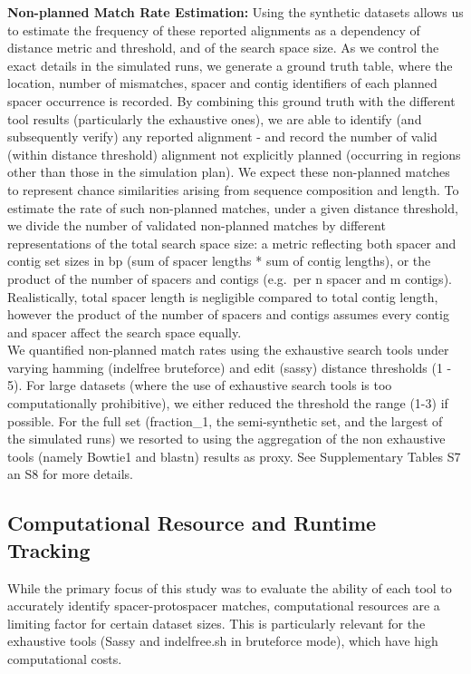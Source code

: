 \documentclass[
]{article}
\begin{document}
\textbf{Non-planned Match Rate Estimation:} Using the synthetic datasets
allows us to estimate the frequency of these reported alignments as a
dependency of distance metric and threshold, and of the search space
size. As we control the exact details in the simulated runs, we generate
a ground truth table, where the location, number of mismatches, spacer
and contig identifiers of each planned spacer occurrence is recorded. By
combining this ground truth with the different tool results
(particularly the exhaustive ones), we are able to identify (and
subsequently verify) any reported alignment - and record the number of
valid (within distance threshold) alignment not explicitly planned
(occurring in regions other than those in the simulation plan). We
expect these non-planned matches to represent chance similarities
arising from sequence composition and length. To estimate the rate of
such non-planned matches, under a given distance threshold, we divide
the number of validated non-planned matches by different representations
of the total search space size: a metric reflecting both spacer and
contig set sizes in bp (sum of spacer lengths * sum of contig lengths),
or the product of the number of spacers and contigs (e.g.~per n spacer
and m contigs). Realistically, total spacer length is negligible
compared to total contig length, however the product of the number of
spacers and contigs assumes every contig and spacer affect the search
space equally.\\
We quantified non-planned match rates using the exhaustive search tools
under varying hamming (indelfree bruteforce) and edit (sassy) distance
thresholds (1 - 5). For large datasets (where the use of exhaustive
search tools is too computationally prohibitive), we either reduced the
threshold the range (1-3) if possible. For the full set (fraction\_1,
the semi-synthetic set, and the largest of the simulated runs) we
resorted to using the aggregation of the non exhaustive tools (namely
Bowtie1 and blastn) results as proxy. See Supplementary Tables S7 an S8
for more details.

\subsection{Computational Resource and Runtime
Tracking}\label{sec-resource-tracking}

While the primary focus of this study was to evaluate the ability of
each tool to accurately identify spacer-protospacer matches,
computational resources are a limiting factor for certain dataset sizes.
This is particularly relevant for the exhaustive tools (Sassy and
indelfree.sh in bruteforce mode), which have high computational costs.
\end{document}
